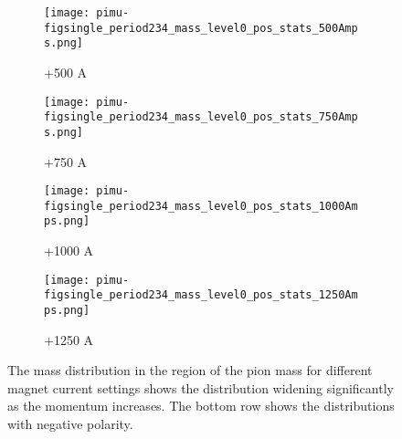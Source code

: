 \begin{figure}[h]
            \begin{subfigure}[b]{0.24\textwidth}
            \centering
            \texttt{[image: pimu-figsingle\_period234\_mass\_level0\_pos\_stats\_500Amps.png]}
            \caption{+500 A}
            \label{fig_mpimu+500}
            \end{subfigure}
             \hfill   
            \begin{subfigure}[b]{0.24\textwidth}
            \centering
            \texttt{[image: pimu-figsingle\_period234\_mass\_level0\_pos\_stats\_750Amps.png]}
            \caption{+750 A}
            \label{fig_mpimu+750}
            \end{subfigure}
             \hfill   
            \begin{subfigure}[b]{0.24\textwidth}
            \centering
            \texttt{[image: pimu-figsingle\_period234\_mass\_level0\_pos\_stats\_1000Amps.png]}
            \caption{+1000 A}
            \label{fig_mpimu+1000}
            \end{subfigure}
             \hfill                             
             \begin{subfigure}[b]{0.24\textwidth}
            \centering
            \texttt{[image: pimu-figsingle\_period234\_mass\_level0\_pos\_stats\_1250Amps.png]}
            \caption{+1250 A}
            \label{fig_mpimu+1250}
            \end{subfigure}
                        
\caption{The mass distribution in the region of the pion mass for different magnet current settings shows the distribution widening significantly as the momentum increases. The bottom row shows the distributions with negative polarity.}
\label{fig_pimumass}
  \end{figure}
 

